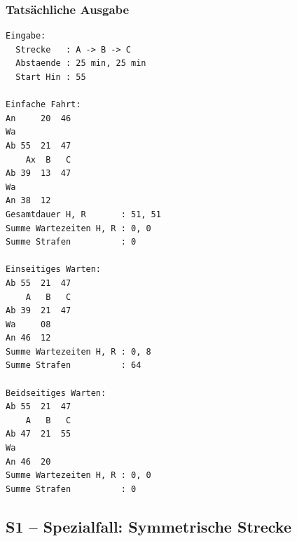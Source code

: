 \documentclass[12pt,a4paper]{article}
\begin{document}
\begin{minipage}[t]{0.48\textwidth}
\scriptsize
\subsubsection*{Tatsächliche Ausgabe}
\begin{lstlisting}
Eingabe:
  Strecke   : A -> B -> C
  Abstaende : 25 min, 25 min
  Start Hin : 55

Einfache Fahrt:
An     20  46
Wa
Ab 55  21  47
    Ax  B   C
Ab 39  13  47
Wa
An 38  12
Gesamtdauer H, R       : 51, 51
Summe Wartezeiten H, R : 0, 0
Summe Strafen          : 0

Einseitiges Warten:
Ab 55  21  47
    A   B   C
Ab 39  21  47
Wa     08
An 46  12
Summe Wartezeiten H, R : 0, 8
Summe Strafen          : 64

Beidseitiges Warten:
Ab 55  21  47
    A   B   C
Ab 47  21  55
Wa
An 46  20
Summe Wartezeiten H, R : 0, 0
Summe Strafen          : 0
\end{lstlisting}
\end{minipage}

\subsection{S1 – Spezialfall: Symmetrische Strecke}
\label{test:s1}
\end{document}
